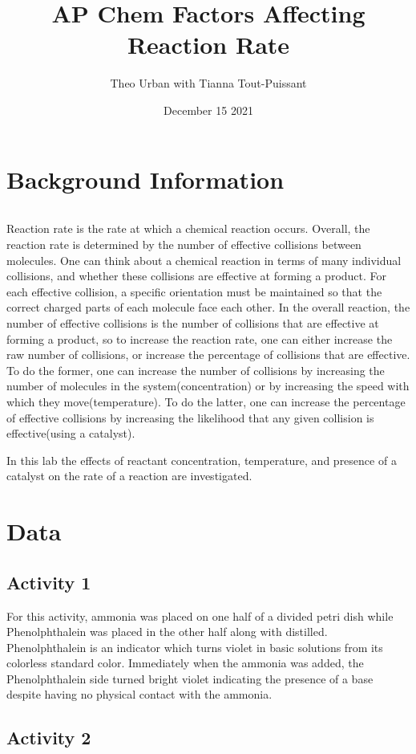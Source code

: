 \documentclass{article}
\title{AP Chem Factors Affecting Reaction Rate}
\author{Theo Urban with Tianna Tout-Puissant}
\date{December 15 2021}
\begin{document}
\maketitle

\section{Background Information}
$\ $

Reaction rate is the rate at which a chemical reaction occurs. Overall, the reaction rate is determined by the number of effective collisions between molecules. One can think about a chemical reaction in terms of many individual collisions, and whether these collisions are effective at forming a product.  For each effective collision, a specific orientation must be maintained so that the correct charged parts of each molecule face each other. In the overall reaction, the number of effective collisions is the number of collisions that are effective at forming a product, so to increase the reaction rate, one can either increase the raw number of collisions, or increase the percentage of collisions that are effective.  To do the former, one can increase the number of collisions by increasing the number of molecules in the system(concentration) or by increasing the speed with which they move(temperature).  To do the latter, one can increase the percentage of effective collisions by increasing the likelihood that any given collision is effective(using a catalyst).

In this lab the effects of reactant concentration, temperature, and presence of a catalyst on the rate of a reaction are investigated. 
\section{Data}
\subsection{Activity 1}

For this activity, ammonia was placed on one half of a divided petri dish while Phenolphthalein was placed in the other half along with distilled.  Phenolphthalein is an indicator which turns violet in basic solutions from its colorless standard color. Immediately when the ammonia was added, the Phenolphthalein side turned bright violet indicating the presence of a base despite having no physical contact with the ammonia.  
\subsection{Activity 2}
\end{document}
